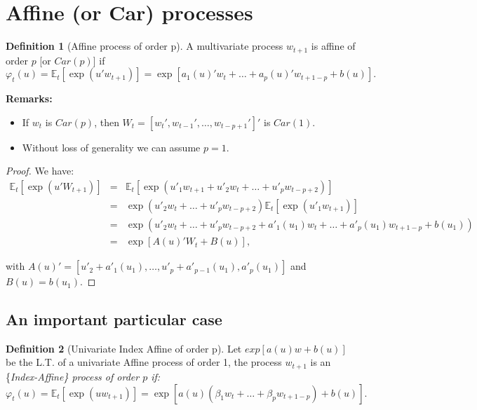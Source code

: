 \documentclass[
  12pt,
]{book}
\theoremstyle{definition}
\newtheorem{definition}{Definition}[chapter]
\theoremstyle{definition}
\theoremstyle{definition}
\theoremstyle{definition}
\theoremstyle{remark}
\begin{document}
\hypertarget{CarProcesses}{%
\section{Affine (or Car) processes}\label{CarProcesses}}

\begin{definition}[Affine process of order p]
\protect\hypertarget{def:Carp}{}\label{def:Carp}A multivariate process \(w_{t+1}\) is affine of order \(p\) {[}or \(Car(p)\){]} if
\[
\varphi_t(u)=\mathbb{E}_t[\exp(u' w_{t+1})]=\exp[a_1(u)'w_t+\dots+a_p(u)'w_{t+1-p}+b(u)].
\]
\end{definition}

\textbf{Remarks:}

\begin{itemize}
\item
  If \(w_t\) is \(Car(p)\), then \(W_t = [w_t', w_{t-1}',\dots,w_{t-p+1}']'\) is \(Car(1)\).
\item
  Without loss of generality we can assume \(p = 1\).
\end{itemize}

\begin{proof}
We have:
\begin{eqnarray*}
\mathbb{E}_t[\exp(u'W_{t+1})] &=& \mathbb{E}_t[\exp(u'_1 w_{t+1}+u'_2 w_t+\dots+u'_p w_{t-p+2})] \\
&=& \exp(u'_2 w_t+\dots+u'_p w_{t-p+2})\mathbb{E}_t[\exp(u'_1 w_{t+1})] \\
&=& \exp(u'_2 w_t+\dots+u'_p w_{t-p+2}+a'_1(u_1)
w_t  +\dots+a'_p(u_1)w_{t+1-p}+b(u_1)) \\
&=& \exp[A(u)'W_t+B(u)],
\end{eqnarray*}

with \(A(u)' = [u'_2+a'_1(u_1),\dots,u'_p+a'_{p-1}(u_1), a'_p(u_1)]\) and \(B(u) = b(u_1)\).
\end{proof}

\hypertarget{an-important-particular-case}{%
\subsection{An important particular case}\label{an-important-particular-case}}

\begin{definition}[Univariate Index Affine of order p]
Let \(exp[a(u)w+b(u)]\) be the L.T. of a univariate Affine process of order 1, the process \(w_{t+1}\) is an \{\it Index-Affine\} process of order \(p\) if:
\[
\varphi_t(u)=\mathbb{E}_t[\exp(u w_{t+1})]=\exp[a(u)(\beta_1 w_t+\dots+\beta_p
w_{t+1-p})+b(u)].
\]
\end{definition}
\end{document}
